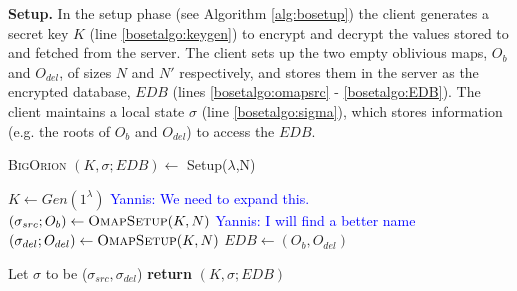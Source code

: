 \documentclass[sigconf]{acmart}
\newcommand{\yannis}[1]{\textcolor{blue}{Yannis: #1}}
\newcommand{\BigOrion}{\textsc{BigOrion }}
\begin{document}
\noindent\textbf{Setup.}
In the setup phase (see Algorithm \ref{alg:bosetup}) the client generates a secret key $K$  (line \ref{bosetalgo:keygen}) to encrypt and decrypt the values stored to and fetched from the server. The client sets up the two empty oblivious maps, $O_{b}$ and $O_{del}$, of sizes $N$ and $N'$ respectively, and stores them in the server as the encrypted database, $EDB$ (lines \ref{bosetalgo:omapsrc} -  \ref{bosetalgo:EDB}).  The client maintains a local state $\sigma$ (line \ref{bosetalgo:sigma}), which stores information (e.g. the roots of $O_{b}$ and $O_{del}$) to access the $EDB$.


\begin{algorithm}
\caption{\BigOrion $(K,\sigma; EDB) \leftarrow$ Setup($\lambda$,N)}\label{alg:bosetup}
\begin{algorithmic}[1]
\State $K \gets Gen(1^{\lambda})$ \label{bosetalgo:keygen}\yannis{We need to expand this.}
\State $(\sigma_{src}; O_{b}) \leftarrow \textsc{OmapSetup}(K,N)$ \label{bosetalgo:omapsrc} \yannis{I will find a better name}
\State $(\sigma_{del}; O_{del}) \leftarrow \textsc{OmapSetup}(K,N)$ \label{bosetalgo:omapdel} 
\State $EDB \gets (O_{b}, O_{del})$\label{bosetalgo:EDB}

\State Let $\sigma$ to be ($\sigma_{src},\sigma_{del}$) \label{bosetalgo:sigma}
\State \textbf{return} $(K,\sigma; EDB)$
\end{algorithmic}
\label{Algo:BigorionSetup}
\end{algorithm}
\end{document}
